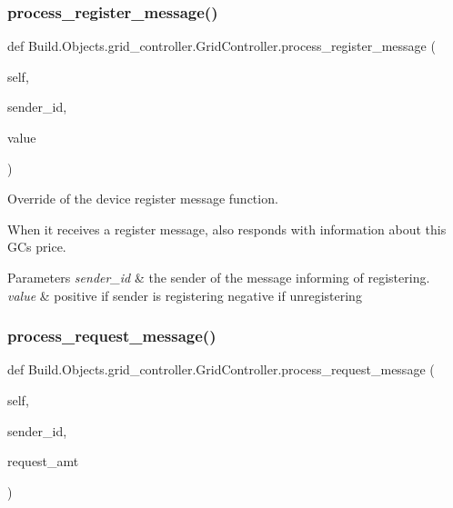 \subsubsection{\texorpdfstring{process\+\_\+register\+\_\+message()}{process\_register\_message()}}
{\footnotesize\ttfamily def Build.\+Objects.\+grid\+\_\+controller.\+Grid\+Controller.\+process\+\_\+register\+\_\+message (\begin{DoxyParamCaption}\item[{}]{self,  }\item[{}]{sender\+\_\+id,  }\item[{}]{value }\end{DoxyParamCaption})}



Override of the device register message function. 

When it receives a register message, also responds with information about this GC\textquotesingle{}s price.


\begin{DoxyParams}{Parameters}
{\em sender\+\_\+id} & the sender of the message informing of registering. \\
\hline
{\em value} & positive if sender is registering negative if unregistering \\
\hline
\end{DoxyParams}
\mbox{\label{class_build_1_1_objects_1_1grid__controller_1_1_grid_controller_a70878c4f7a8a7cb46cc1b0097e0d91fd}} 
\subsubsection{\texorpdfstring{process\+\_\+request\+\_\+message()}{process\_request\_message()}}
{\footnotesize\ttfamily def Build.\+Objects.\+grid\+\_\+controller.\+Grid\+Controller.\+process\+\_\+request\+\_\+message (\begin{DoxyParamCaption}\item[{}]{self,  }\item[{}]{sender\+\_\+id,  }\item[{}]{request\+\_\+amt }\end{DoxyParamCaption})}



